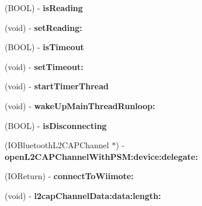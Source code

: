 \begin{DoxyCompactItemize}
\item 
\hypertarget{interface_wii_connect_a74284a0ae888b1ad908eb291ecfdc8aa}{(B\-O\-O\-L) -\/ {\bfseries is\-Reading}}\label{interface_wii_connect_a74284a0ae888b1ad908eb291ecfdc8aa}

\item 
\hypertarget{interface_wii_connect_ab445f7a46e0cfb42277cbc3958a156ac}{(void) -\/ {\bfseries set\-Reading\-:}}\label{interface_wii_connect_ab445f7a46e0cfb42277cbc3958a156ac}

\item 
\hypertarget{interface_wii_connect_ac0aa68b9292a1ebda783bcd69a53f95d}{(B\-O\-O\-L) -\/ {\bfseries is\-Timeout}}\label{interface_wii_connect_ac0aa68b9292a1ebda783bcd69a53f95d}

\item 
\hypertarget{interface_wii_connect_ad2ebf6f8435e3d488c2724438d7c5c74}{(void) -\/ {\bfseries set\-Timeout\-:}}\label{interface_wii_connect_ad2ebf6f8435e3d488c2724438d7c5c74}

\item 
\hypertarget{interface_wii_connect_a27543afb7718e458fb8b5b8500e071a2}{(void) -\/ {\bfseries start\-Timer\-Thread}}\label{interface_wii_connect_a27543afb7718e458fb8b5b8500e071a2}

\item 
\hypertarget{interface_wii_connect_ad47fd281f45b82042c2168c1e803f9e0}{(void) -\/ {\bfseries wake\-Up\-Main\-Thread\-Runloop\-:}}\label{interface_wii_connect_ad47fd281f45b82042c2168c1e803f9e0}

\item 
\hypertarget{interface_wii_connect_ad2b8020e75cb59e1a8fc35b05df021e0}{(B\-O\-O\-L) -\/ {\bfseries is\-Disconnecting}}\label{interface_wii_connect_ad2b8020e75cb59e1a8fc35b05df021e0}

\item 
\hypertarget{interface_wii_connect_aeec8f6b2f4403eeb971b8dc22a875e02}{(I\-O\-Bluetooth\-L2\-C\-A\-P\-Channel $\ast$) -\/ {\bfseries open\-L2\-C\-A\-P\-Channel\-With\-P\-S\-M\-:device\-:delegate\-:}}\label{interface_wii_connect_aeec8f6b2f4403eeb971b8dc22a875e02}

\item 
\hypertarget{interface_wii_connect_a26884a3572482e8b5de501fec7711251}{(I\-O\-Return) -\/ {\bfseries connect\-To\-Wiimote\-:}}\label{interface_wii_connect_a26884a3572482e8b5de501fec7711251}

\item 
\hypertarget{interface_wii_connect_aa1af2b456935bf635f4241fba83cbb3c}{(void) -\/ {\bfseries l2cap\-Channel\-Data\-:data\-:length\-:}}\label{interface_wii_connect_aa1af2b456935bf635f4241fba83cbb3c}


\end{DoxyCompactItemize}
